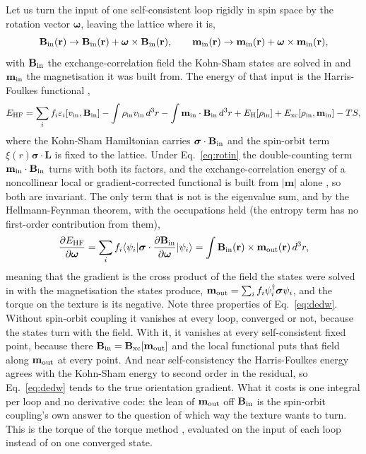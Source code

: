 \documentclass[11pt]{article}
\begin{document}
Let us turn the input of one self-consistent loop rigidly in spin space by the
rotation vector $\boldsymbol\omega$, leaving the lattice where it is,
\begin{equation}
  \mathbf B_{\rm in}(\mathbf r)\to\mathbf B_{\rm in}(\mathbf r)
  +\boldsymbol\omega\times\mathbf B_{\rm in}(\mathbf r),
  \qquad
  \mathbf m_{\rm in}(\mathbf r)\to\mathbf m_{\rm in}(\mathbf r)
  +\boldsymbol\omega\times\mathbf m_{\rm in}(\mathbf r),
  \label{eq:rotin}
\end{equation}
with $\mathbf B_{\rm in}$ the exchange-correlation field the Kohn-Sham states
are solved in and $\mathbf m_{\rm in}$ the magnetisation it was built from. The
energy of that input is the Harris-Foulkes functional
\cite{harris1985,foulkes1989},
\begin{equation}
  E_{\rm HF}=\sum_i f_i\varepsilon_i[v_{\rm in},\mathbf B_{\rm in}]
  -\int\rho_{\rm in}v_{\rm in}\,d^3r
  -\int\mathbf m_{\rm in}\cdot\mathbf B_{\rm in}\,d^3r
  +E_{\rm H}[\rho_{\rm in}]+E_{\rm xc}[\rho_{\rm in},\mathbf m_{\rm in}]
  -TS ,
  \label{eq:harris}
\end{equation}
where the Kohn-Sham Hamiltonian carries $\boldsymbol\sigma\cdot\mathbf B_{\rm
in}$ and the spin-orbit term $\xi(r)\boldsymbol\sigma\cdot\mathbf L$ is fixed
to the lattice. Under Eq.~\eqref{eq:rotin} the double-counting term
$\mathbf m_{\rm in}\cdot\mathbf B_{\rm in}$ turns with both its factors, and
the exchange-correlation energy of a noncollinear local or gradient-corrected
functional is built from $|\mathbf m|$ alone \cite{kubler1988}, so both are
invariant. The only term that is not is the eigenvalue sum, and by the
Hellmann-Feynman theorem, with the occupations held (the entropy term has no
first-order contribution from them),
\begin{equation}
  \frac{\partial E_{\rm HF}}{\partial\boldsymbol\omega}
  =\sum_i f_i\langle\psi_i|\boldsymbol\sigma\cdot
     \frac{\partial\mathbf B_{\rm in}}{\partial\boldsymbol\omega}|\psi_i\rangle
  =\int\mathbf B_{\rm in}(\mathbf r)\times\mathbf m_{\rm out}(\mathbf r)\,d^3r ,
  \label{eq:dedw}
\end{equation}
meaning that the gradient is the cross product of the field the states were
solved in with the magnetisation the states produce,
$\mathbf m_{\rm out}=\sum_i f_i\psi_i^\dagger\boldsymbol\sigma\psi_i$, and the
torque on the texture is its negative. Note three properties of
Eq.~\eqref{eq:dedw}. Without spin-orbit coupling it vanishes at every loop,
converged or not, because the states turn with the field. With it, it
vanishes at every self-consistent fixed point, because there $\mathbf B_{\rm
in}=\mathbf B_{\rm xc}[\mathbf m_{\rm out}]$ and the local functional puts that
field along $\mathbf m_{\rm out}$ at every point. And near self-consistency
the Harris-Foulkes energy agrees with the Kohn-Sham energy to second order in
the residual, so Eq.~\eqref{eq:dedw} tends to the true orientation gradient.
What it costs is one integral per loop and no derivative code: the lean of
$\mathbf m_{\rm out}$ off $\mathbf B_{\rm in}$ is the spin-orbit coupling's
own answer to the question of which way the texture wants to turn. This is
the torque of the torque method \cite{wang1996}, evaluated on the input of
each loop instead of on one converged state.
\end{document}
